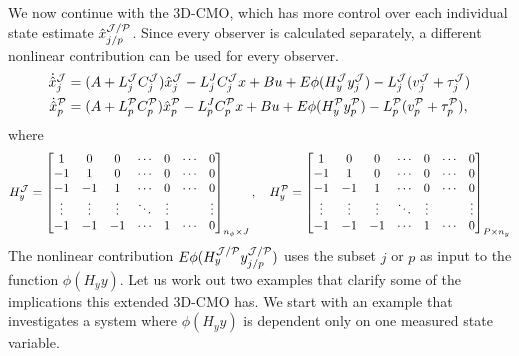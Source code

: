 We now continue with the 3D-CMO, which has more control over each individual state estimate $\hat{x}^{\mathcal{J}/\mathcal{P}}_{j/p}$. Since every observer is calculated separately, a different nonlinear contribution can be used for every observer.
\begin{equation}\label{eqn:ext-NL-observer}
    \begin{split}
        \dot{\hat{x}}_{j}^{\mathcal{J}} &= (A + L_{j}^{\mathcal{J}}C_{j}^{\mathcal{J}})\hat{x}^{\mathcal{J}}_{j} - L_{j}^JC_{j}^{\mathcal{J}}x + Bu + E\phi(H^{\mathcal{J}}_yy^{\mathcal{J}}_{j}) - L_{j}^{\mathcal{J}}(v_{j}^{\mathcal{J}} + \tau_{j}^{\mathcal{J}}) \\
        \dot{\hat{x}}_{p}^{\mathcal{P}} &= (A + L_{p}^{\mathcal{P}}C_{p}^{\mathcal{P}})\hat{x}^{\mathcal{P}}_{p} - L_{p}^JC_{p}^{\mathcal{P}}x + Bu + E\phi(H^{\mathcal{P}}_yy^{\mathcal{P}}_{p}) - L_{p}^{\mathcal{P}}(v_{p}^{\mathcal{P}} + \tau_{p}^{\mathcal{P}}),
    \end{split}
\end{equation}
where
\begin{equation*}
    H^{\mathcal{J}}_y = 
    \begin{bmatrix}
        1 & 0 & 0 & \cdots & 0 & \cdots & 0 \\
        -1 & 1 & 0 & \cdots & 0 & \cdots & 0 \\
        -1 & -1 & 1 & \cdots & 0 & \cdots & 0 \\
        \vdots & \vdots & \vdots & \ddots & \vdots &  & \vdots \\
        -1 & -1 & -1 & \cdots & 1 & \cdots & 0 \\
    \end{bmatrix}_{n_{\phi} \times J}, \quad
    H^{\mathcal{P}}_y = 
    \begin{bmatrix}
        1 & 0 & 0 & \cdots & 0 & \cdots & 0 \\
        -1 & 1 & 0 & \cdots & 0 & \cdots & 0 \\
        -1 & -1 & 1 & \cdots & 0 & \cdots & 0 \\
        \vdots & \vdots & \vdots & \ddots & \vdots &  & \vdots \\
        -1 & -1 & -1 & \cdots & 1 & \cdots & 0 \\
    \end{bmatrix}_{P \times n_y}
\end{equation*}
The nonlinear contribution $E\phi(H^{\mathcal{J}/\mathcal{P}}_yy^{\mathcal{J}/\mathcal{P}}_{j/p})$ uses the subset $j$ or $p$ as input to the function $\phi(H_yy)$. Let us work out two examples that clarify some of the implications this extended 3D-CMO has. We start with an example that investigates a system where $\phi(H_yy)$ is dependent only on one measured state variable.

